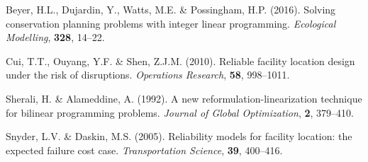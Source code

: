 \documentclass[11pt,]{article}
\begin{document}
Beyer, H.L., Dujardin, Y., Watts, M.E. \& Possingham, H.P. (2016).
Solving conservation planning problems with integer linear programming.
\emph{Ecological Modelling}, \textbf{328}, 14--22.

Cui, T.T., Ouyang, Y.F. \& Shen, Z.J.M. (2010). Reliable facility
location design under the risk of disruptions. \emph{Operations
Research}, \textbf{58}, 998--1011.

Sherali, H. \& Alameddine, A. (1992). A new reformulation-linearization
technique for bilinear programming problems. \emph{Journal of Global
Optimization}, \textbf{2}, 379--410.

Snyder, L.V. \& Daskin, M.S. (2005). Reliability models for facility
location: the expected failure cost case. \emph{Transportation Science},
\textbf{39}, 400--416.
\end{document}
